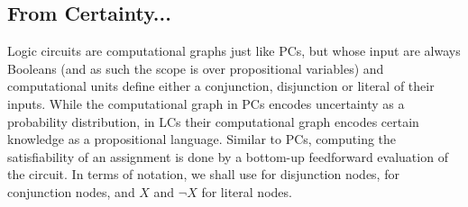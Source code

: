 \subsection{From Certainty...}
\label{subsection:fromcertainty}

Logic circuits are computational graphs just like PCs, but whose input are always Booleans (and as
such the scope is over propositional variables) and computational units define either a
conjunction, disjunction or literal of their inputs. While the computational graph in PCs encodes
uncertainty as a probability distribution, in LCs their computational graph encodes certain
knowledge as a propositional language. Similar to PCs, computing the satisfiability of an
assignment is done by a bottom-up feedforward evaluation of the circuit. In terms of notation, we
shall use \inode{\newOrNode} for disjunction nodes, \inode{\newAndNode} for conjunction nodes, and
$X$ and $\neg X$ for literal nodes.

